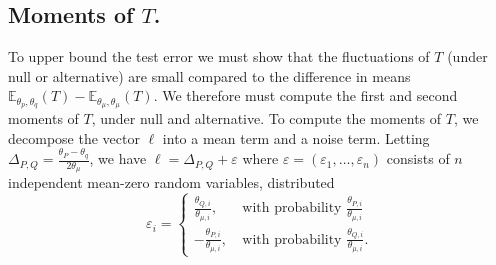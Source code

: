 \documentclass{article}
\newcommand{\1}{\mathbf{1}}
\newcommand{\Ebb}{\mathbb{E}}
\theoremstyle{alden}
\theoremstyle{aldenthm}
\theoremstyle{definition}
\theoremstyle{remark}
\begin{document}
\subsection{Moments of $T$.}
To upper bound the test error we must show that the fluctuations of $T$ (under null or alternative)  are small compared to the difference in means $\Ebb_{\theta_{p},\theta_q}(T) - \Ebb_{\theta_{\mu},\theta_{\mu}}(T)$. We therefore must compute the first and second moments of $T$, under null and alternative. To compute the moments of $T$, we decompose the vector $\ell$ into a mean term and a noise term. Letting $\Delta_{P,Q} = \frac{\theta_P - \theta_q}{2\theta_{\mu}}$, we have $\ell = \Delta_{P,Q} + \varepsilon$ where $\varepsilon = (\varepsilon_1,\ldots,\varepsilon_n)$ consists of $n$ independent mean-zero random variables, distributed
\begin{equation*}
\varepsilon_i = 
\begin{cases}
\frac{\theta_{Q,i}}{\theta_{\mu,i}}, ~ & \textrm{with probability $\frac{\theta_{P,i}}{\theta_{\mu,i}}$} \\
-\frac{\theta_{P,i}}{\theta_{\mu,i}}, ~ & \textrm{with probability $\frac{\theta_{Q,i}}{\theta_{\mu,i}}$}.
\end{cases}
\end{equation*}
\end{document}
